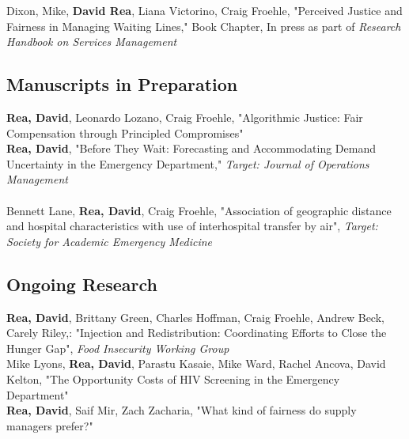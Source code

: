 \documentclass[12pt, letter]{moderncv}
\begin{document}
\medskip
Dixon, Mike, \textbf{David Rea}, Liana Victorino, Craig Froehle, "Perceived Justice and Fairness in Managing Waiting Lines," Book Chapter, \newline In press as part of \textit{Research Handbook on Services Management}


\subsection{Manuscripts in Preparation}
\smallskip
\textbf{Rea, David}, Leonardo Lozano, Craig Froehle,  "Algorithmic Justice: Fair Compensation through Principled Compromises" \textit{}
\medskip\\
\textbf{Rea, David}, "Before They Wait: Forecasting and Accommodating Demand Uncertainty in the Emergency Department," \textit{Target: Journal of Operations Management}
\medskip\\
%
\medskip \\
Bennett Lane, \textbf{Rea, David}, Craig Froehle, "Association of geographic distance and hospital characteristics with use of interhospital transfer by air", \textit{Target: Society for Academic Emergency Medicine} 

\subsection{Ongoing Research}

\textbf{Rea, David}, Brittany Green, Charles Hoffman, Craig Froehle, Andrew Beck, Carely Riley,: "Injection and Redistribution: Coordinating Efforts to Close the Hunger Gap", \textit{Food Insecurity Working Group}
\medskip \\
 Mike Lyons, \textbf{Rea, David}, Parastu Kasaie, Mike Ward, Rachel Ancova, David Kelton, "The Opportunity Costs of HIV Screening in the Emergency Department" 
\medskip \\
\textbf{Rea, David}, Saif Mir, Zach Zacharia, "What kind of fairness do supply managers prefer?" 
\end{document}
